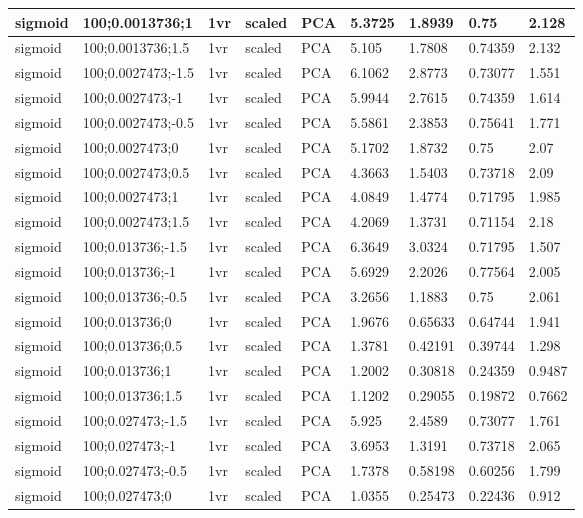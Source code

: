 \begin{longtable}{lllllllll}
sigmoid & 100;0.0013736;1 & 1vr & scaled & PCA & 5.3725 & 1.8939 & 0.75 & 2.128\\ \hline
sigmoid & 100;0.0013736;1.5 & 1vr & scaled & PCA & 5.105 & 1.7808 & 0.74359 & 2.132\\ \hline
sigmoid & 100;0.0027473;-1.5 & 1vr & scaled & PCA & 6.1062 & 2.8773 & 0.73077 & 1.551\\ \hline
sigmoid & 100;0.0027473;-1 & 1vr & scaled & PCA & 5.9944 & 2.7615 & 0.74359 & 1.614\\ \hline
sigmoid & 100;0.0027473;-0.5 & 1vr & scaled & PCA & 5.5861 & 2.3853 & 0.75641 & 1.771\\ \hline
sigmoid & 100;0.0027473;0 & 1vr & scaled & PCA & 5.1702 & 1.8732 & 0.75 & 2.07\\ \hline
sigmoid & 100;0.0027473;0.5 & 1vr & scaled & PCA & 4.3663 & 1.5403 & 0.73718 & 2.09\\ \hline
sigmoid & 100;0.0027473;1 & 1vr & scaled & PCA & 4.0849 & 1.4774 & 0.71795 & 1.985\\ \hline
sigmoid & 100;0.0027473;1.5 & 1vr & scaled & PCA & 4.2069 & 1.3731 & 0.71154 & 2.18\\ \hline
sigmoid & 100;0.013736;-1.5 & 1vr & scaled & PCA & 6.3649 & 3.0324 & 0.71795 & 1.507\\ \hline
sigmoid & 100;0.013736;-1 & 1vr & scaled & PCA & 5.6929 & 2.2026 & 0.77564 & 2.005\\ \hline
sigmoid & 100;0.013736;-0.5 & 1vr & scaled & PCA & 3.2656 & 1.1883 & 0.75 & 2.061\\ \hline
sigmoid & 100;0.013736;0 & 1vr & scaled & PCA & 1.9676 & 0.65633 & 0.64744 & 1.941\\ \hline
sigmoid & 100;0.013736;0.5 & 1vr & scaled & PCA & 1.3781 & 0.42191 & 0.39744 & 1.298\\ \hline
sigmoid & 100;0.013736;1 & 1vr & scaled & PCA & 1.2002 & 0.30818 & 0.24359 & 0.9487\\ \hline
sigmoid & 100;0.013736;1.5 & 1vr & scaled & PCA & 1.1202 & 0.29055 & 0.19872 & 0.7662\\ \hline
sigmoid & 100;0.027473;-1.5 & 1vr & scaled & PCA & 5.925 & 2.4589 & 0.73077 & 1.761\\ \hline
sigmoid & 100;0.027473;-1 & 1vr & scaled & PCA & 3.6953 & 1.3191 & 0.73718 & 2.065\\ \hline
sigmoid & 100;0.027473;-0.5 & 1vr & scaled & PCA & 1.7378 & 0.58198 & 0.60256 & 1.799\\ \hline
sigmoid & 100;0.027473;0 & 1vr & scaled & PCA & 1.0355 & 0.25473 & 0.22436 & 0.912\\ \hline

\end{longtable}
